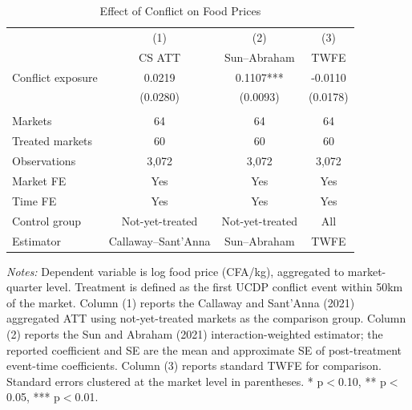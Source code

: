 \begin{table}[H]
\centering
\caption{Effect of Conflict on Food Prices}
\label{tab:main}
\begin{threeparttable}
\begin{tabular}{lccc}
\toprule
 & (1) & (2) & (3) \\
 & CS ATT & Sun--Abraham & TWFE \\
\midrule
Conflict exposure & 0.0219 & 0.1107*** & -0.0110 \\
 & (0.0280) & (0.0093) & (0.0178) \\
\\
Markets & 64 & 64 & 64 \\
Treated markets & 60 & 60 & 60 \\
Observations & 3,072 & 3,072 & 3,072 \\
Market FE & Yes & Yes & Yes \\
Time FE & Yes & Yes & Yes \\
Control group & Not-yet-treated & Not-yet-treated & All \\
Estimator & Callaway--Sant'Anna & Sun--Abraham & TWFE \\
\bottomrule
\end{tabular}
\begin{tablenotes}[flushleft]
\small
\item \textit{Notes:} Dependent variable is log food price (CFA/kg), aggregated to market-quarter level. Treatment is defined as the first UCDP conflict event within 50km of the market. Column (1) reports the Callaway and Sant'Anna (2021) aggregated ATT using not-yet-treated markets as the comparison group. Column (2) reports the Sun and Abraham (2021) interaction-weighted estimator; the reported coefficient and SE are the mean and approximate SE of post-treatment event-time coefficients. Column (3) reports standard TWFE for comparison. Standard errors clustered at the market level in parentheses. * p$<$0.10, ** p$<$0.05, *** p$<$0.01.
\end{tablenotes}
\end{threeparttable}
\end{table}

